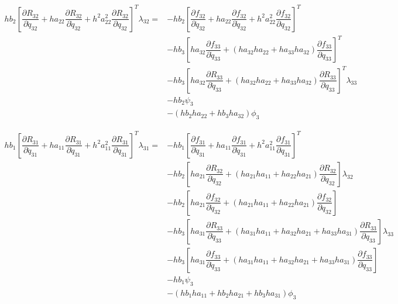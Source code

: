 \documentclass[10pt,letter]{book}
\newcommand{\pd}[2]{\dfrac{\partial #1}{\partial #2}}
\begin{document}
     \begin{equation}
       \begin{split}
         hb_2\left[\pd{R_{32}}{\ddot{q}_{32}} + ha_{22}\pd{R_{32}}{\dot{q}_{32}} + h^2a_{22}^2 \pd{R_{32}}{{q}_{32}} \right]^T \lambda_{32} = & - hb_2 \left[\pd{f_{32}}{\ddot{q}_{32}} + ha_{22}\pd{f_{32}}{\dot{q}_{32}} + h^2a_{22}^2 \pd{f_{32}}{{q}_{32}} \right]^T \\ 
         & - hb_3 \left[ha_{32}\pd{f_{33}}{\dot{q}_{33}} + (ha_{32}ha_{22} + ha_{33}ha_{32}) \pd{f_{33}}{{q}_{33}} \right]^T \\  
         & - hb_3 \left[ha_{32}\pd{R_{33}}{\dot{q}_{33}} + (ha_{32}ha_{22} + ha_{33}ha_{32}) \pd{R_{33}}{{q}_{33}} \right]^T\lambda_{33} \\  
         & - hb_2  \psi_3 \\ 
         & - (hb_2ha_{22} + hb_3 ha_{32})   \phi_3
       \end{split}
     \end{equation}

     \begin{equation}
       \begin{split}
         hb_1\left[\pd{R_{31}}{\ddot{q}_{31}} + ha_{11}\pd{R_{31}}{\dot{q}_{31}} + h^2a_{11}^2 \pd{R_{31}}{{q}_{31}} \right]^T \lambda_{31} = & - hb_1 \left[\pd{f_{31}}{\ddot{q}_{31}} + ha_{11}\pd{f_{31}}{\dot{q}_{31}} + h^2a_{11}^2 \pd{f_{31}}{{q}_{31}} \right]^T \\ 
         & - hb_2 \left[ ha_{21} \pd{R_{32}}{\dot{q}_{32}} + (ha_{21}ha_{11} + ha_{22}ha_{21}) \pd{R_{32}}{{q}_{32}} \right]\lambda_{32} \\
         & - hb_2 \left[ ha_{21} \pd{f_{32}}{\dot{q}_{32}} + (ha_{21}ha_{11} + ha_{22}ha_{21}) \pd{f_{32}}{{q}_{32}} \right] \\
         & - hb_3 \left[ ha_{31} \pd{R_{33}}{\dot{q}_{33}} + (ha_{31}ha_{11} + ha_{32}ha_{21} + ha_{33}ha_{31}) \pd{R_{33}}{{q}_{33}} \right] \lambda_{33} \\
         & - hb_3 \left[ ha_{31} \pd{f_{33}}{\dot{q}_{33}} + (ha_{31}ha_{11} + ha_{32}ha_{21} + ha_{33}ha_{31}) \pd{f_{33}}{{q}_{33}} \right] \\
         & - hb_1 \psi_3 \\ 
         & - (hb_1ha_{11} + hb_2ha_{21}+ hb_3ha_{31})  \phi_3
       \end{split}
     \end{equation}

\end{document}
